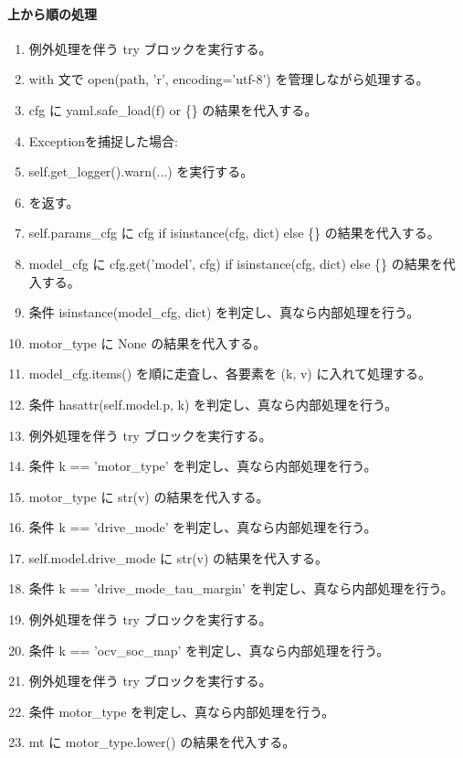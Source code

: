 \documentclass[a4paper,11pt]{article}
\begin{document}
            \paragraph{上から順の処理}
            \begin{enumerate}[leftmargin=1.8em]
            \item 例外処理を伴う try ブロックを実行する。
\item   with 文で open(path, 'r', encoding='utf-8') を管理しながら処理する。
\item     cfg に yaml.safe\_load(f) or \{\} の結果を代入する。
\item   Exceptionを捕捉した場合:
\item   self.get\_logger().warn(...) を実行する。
\item    を返す。
\item self.params\_cfg に cfg if isinstance(cfg, dict) else \{\} の結果を代入する。
\item model\_cfg に cfg.get('model', cfg) if isinstance(cfg, dict) else \{\} の結果を代入する。
\item 条件 isinstance(model\_cfg, dict) を判定し、真なら内部処理を行う。
\item   motor\_type に None の結果を代入する。
\item   model\_cfg.items() を順に走査し、各要素を (k, v) に入れて処理する。
\item     条件 hasattr(self.model.p, k) を判定し、真なら内部処理を行う。
\item       例外処理を伴う try ブロックを実行する。
\item     条件 k == 'motor\_type' を判定し、真なら内部処理を行う。
\item       motor\_type に str(v) の結果を代入する。
\item     条件 k == 'drive\_mode' を判定し、真なら内部処理を行う。
\item       self.model.drive\_mode に str(v) の結果を代入する。
\item     条件 k == 'drive\_mode\_tau\_margin' を判定し、真なら内部処理を行う。
\item       例外処理を伴う try ブロックを実行する。
\item     条件 k == 'ocv\_soc\_map' を判定し、真なら内部処理を行う。
\item       例外処理を伴う try ブロックを実行する。
\item   条件 motor\_type を判定し、真なら内部処理を行う。
\item     mt に motor\_type.lower() の結果を代入する。

\end{enumerate}
\end{document}

